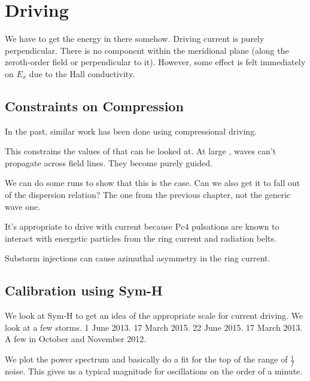 \section{Driving}
  \label{sec_driving}

We have to get the energy in there somehow. Driving current is purely perpendicular. There is no component within the meridional plane (along the zeroth-order field or perpendicular to it). However, some effect is felt immediately on $E_x$ due to the Hall conductivity. 

\subsection{Constraints on Compression}

In the past, similar work has been done using compressional driving. 

This constrains the values of \azm that can be looked at. At large \azm, \Alfven waves can't propagate across field lines. They become purely guided. 

We can do some runs to show that this is the case. Can we also get it to fall out of the dispersion relation? The one from the previous chapter, not the generic \Alfven wave one. 

It's appropriate to drive with current because Pc4 pulsations are known to interact with energetic particles from the ring current and radiation belts. 

Substorm injections can cause azimuthal asymmetry in the ring current. 

\subsection{Calibration using Sym-H}

We look at Sym-H to get an idea of the appropriate scale for current driving. We look at a few storms. 1 June 2013. 17 March 2015. 22 June 2015. 17 March 2013. A few in October and November 2012. 

We plot the power spectrum and basically do a fit for the top of the range of $\frac{1}{f}$ noise. This gives us a typical magnitude for oscillations on the order of a minute. 


